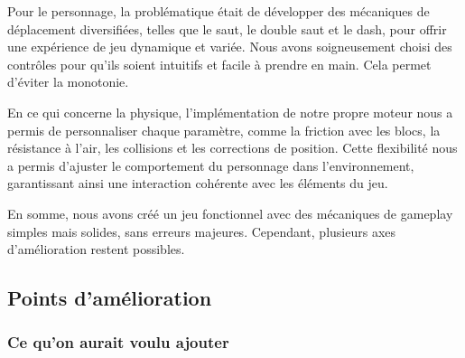 \documentclass[10pt]{report}
\begin{document}
Pour le personnage, la problématique était de développer des mécaniques de déplacement diversifiées, telles que le saut, le double saut et le dash, pour offrir une expérience de jeu dynamique et variée. Nous avons soigneusement choisi des contrôles pour qu’ils soient intuitifs et facile à prendre en main. Cela permet d'éviter la monotonie.

En ce qui concerne la physique, l’implémentation de notre propre moteur nous a permis de personnaliser chaque paramètre, comme la friction avec les blocs, la résistance à l’air, les collisions et les corrections de position. Cette flexibilité nous a permis d’ajuster le comportement du personnage dans l’environnement, garantissant ainsi une interaction cohérente avec les éléments du jeu.

En somme, nous avons créé un jeu fonctionnel avec des mécaniques de gameplay simples mais solides, sans erreurs majeures. Cependant, plusieurs axes d’amélioration restent possibles.  


\subsection{Points d'amélioration}
\subsubsection{Ce qu'on aurait voulu ajouter}
\end{document}
